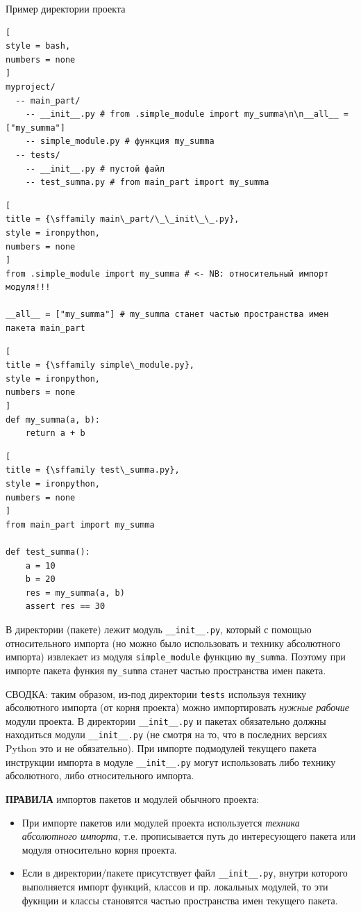 \documentclass[%
	11pt,
	a4paper,
	utf8,
		]{article}
\begin{document}
Пример директории проекта
\begin{lstlisting}[
style = bash,
numbers = none	
]
myproject/
  -- main_part/
    -- __init__.py # from .simple_module import my_summa\n\n__all__ = ["my_summa"]
    -- simple_module.py # функция my_summa
  -- tests/
    -- __init__.py # пустой файл
    -- test_summa.py # from main_part import my_summa
\end{lstlisting}

\begin{lstlisting}[
title = {\sffamily main\_part/\_\_init\_\_.py},
style = ironpython,
numbers = none	
]
from .simple_module import my_summa # <- NB: относительный импорт модуля!!!

__all__ = ["my_summa"] # my_summa станет частью пространства имен пакета main_part
\end{lstlisting}

\begin{lstlisting}[
title = {\sffamily simple\_module.py},
style = ironpython,
numbers = none	
]
def my_summa(a, b):
    return a + b
\end{lstlisting}

\begin{lstlisting}[
title = {\sffamily test\_summa.py},
style = ironpython,
numbers = none	
]
from main_part import my_summa

def test_summa():
    a = 10
    b = 20
    res = my_summa(a, b)
    assert res == 30
\end{lstlisting}

В директории (пакете)  лежит модуль \verb|__init__.py|, который с помощью относительного импорта (но можно было использовать и технику абсолютного импорта) извлекает из модуля \texttt{simple\_module} функцию \texttt{my\_summa}. Поэтому при импорте пакета  функия \texttt{my\_summa} станет частью пространства имен пакета.

СВОДКА: таким образом, из-под директории \texttt{tests} используя технику абсолютного импорта (от корня проекта) можно импортировать \emph{нужные рабочие} модули проекта. В директории \verb|__init__.py| и пакетах обязательно должны находиться модули \verb|__init__.py| (не смотря на то, что в последних версиях Python это и не обязательно). При импорте подмодулей текущего пакета инструкции импорта в модуле \verb|__init__.py| могут использовать либо технику абсолютного, либо относительного импорта.

\textbf{ПРАВИЛА} импортов пакетов и модулей обычного проекта:
\begin{itemize}
	\item При импорте пакетов или модулей проекта используется \emph{техника абсолютного импорта}, т.е. прописывается путь до интересующего пакета или модуля относительно корня проекта.
	
	\item Если в директории/пакете присутствует файл \verb|__init__.py|, внутри которого выполняется импорт функций, классов и пр. локальных модулей, то эти фукнции и классы становятся частью пространства имен текущего пакета.
\end{itemize}
\end{document}
